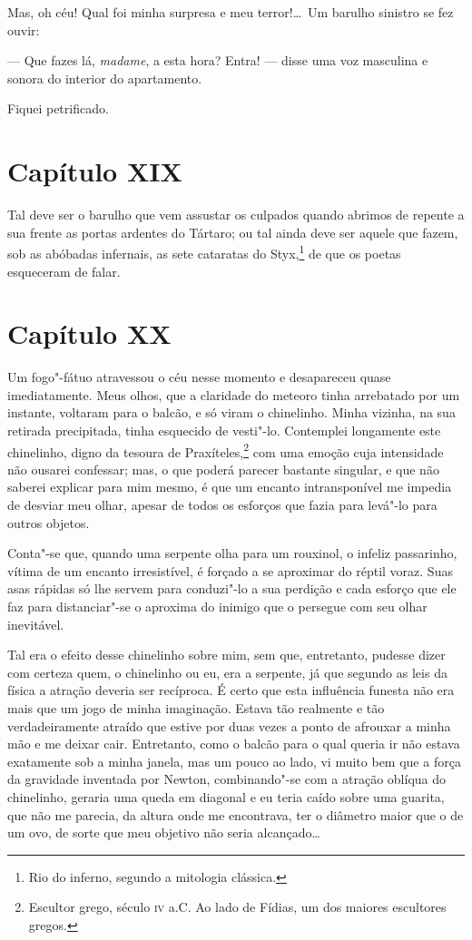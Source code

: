  Mas, oh céu! Qual foi minha surpresa e meu terror!\ldots\ Um barulho
sinistro se fez ouvir:

 --- Que fazes lá, \textit{madame}, a esta hora? Entra! --- disse uma voz
masculina e sonora do interior do apartamento.

 Fiquei petrificado.

\section*{Capítulo XIX}

 Tal deve ser o barulho que vem assustar os culpados quando abrimos de
repente a sua frente as portas ardentes do Tártaro; ou tal ainda deve
ser aquele que fazem, sob as abóbadas infernais, as sete cataratas do
Styx,\footnote{ Rio do inferno, segundo a mitologia clássica.} de
que os poetas esqueceram de falar.

\section*{Capítulo XX}

 Um fogo"-fátuo atravessou o céu nesse momento e desapareceu quase
imediatamente. Meus olhos, que a claridade do meteoro tinha arrebatado
por um instante, voltaram para o balcão, e só viram o chinelinho. Minha
vizinha, na sua retirada precipitada, tinha esquecido de vesti"-lo.
Contemplei longamente este chinelinho, digno da tesoura de
Praxíteles,\footnote{ Escultor grego, século \textsc{iv} a.C. Ao lado de Fídias,
um dos maiores escultores gregos.} com uma emoção cuja
intensidade não ousarei confessar; mas, o que poderá parecer bastante
singular, e que não saberei explicar para mim mesmo, é que um encanto
intransponível me impedia de desviar meu olhar, apesar de todos os
esforços que fazia para levá"-lo para outros objetos. 

 Conta"-se que, quando uma serpente olha para um rouxinol, o infeliz
passarinho, vítima de um encanto irresistível, é forçado a se aproximar
do réptil voraz. Suas asas rápidas só lhe servem para conduzi"-lo a sua
perdição e cada esforço que ele faz para distanciar"-se o aproxima do
inimigo que o persegue com seu olhar inevitável. 

 Tal era o efeito desse chinelinho sobre mim, sem que, entretanto,
pudesse dizer com certeza quem, o chinelinho ou eu, era a serpente, já
que segundo as leis da física a atração deveria ser recíproca. É certo
que esta influência funesta não era mais que um jogo de minha
imaginação. Estava tão realmente e tão verdadeiramente atraído que
estive por duas vezes a ponto de afrouxar a minha mão e me deixar cair.
Entretanto, como o balcão para o qual queria ir não estava exatamente
sob a minha janela, mas um pouco ao lado, vi muito bem que a força da
gravidade inventada por Newton, combinando"-se com a atração oblíqua do
chinelinho, geraria uma queda em diagonal e eu teria caído sobre uma
guarita, que não me parecia, da altura onde me encontrava, ter o
diâmetro maior que o de um ovo, de sorte que meu objetivo não seria
alcançado\ldots

